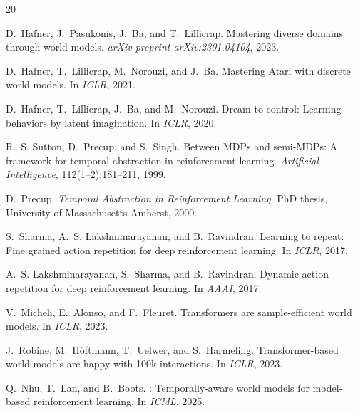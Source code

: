 \documentclass[10pt,letterpaper]{article}
\begin{document}
\begin{thebibliography}{20}

D.~Hafner, J.~Pasukonis, J.~Ba, and T.~Lillicrap.
\newblock Mastering diverse domains through world models.
\newblock \emph{arXiv preprint arXiv:2301.04104}, 2023.

D.~Hafner, T.~Lillicrap, M.~Norouzi, and J.~Ba.
\newblock Mastering {A}tari with discrete world models.
\newblock In \emph{ICLR}, 2021.

D.~Hafner, T.~Lillicrap, J.~Ba, and M.~Norouzi.
\newblock Dream to control: Learning behaviors by latent imagination.
\newblock In \emph{ICLR}, 2020.

R.~S. Sutton, D.~Precup, and S.~Singh.
\newblock Between {MDP}s and semi-{MDP}s: A framework for temporal abstraction in reinforcement learning.
\newblock \emph{Artificial Intelligence}, 112(1--2):181--211, 1999.

D.~Precup.
\newblock \emph{Temporal Abstraction in Reinforcement Learning}.
\newblock PhD thesis, University of Massachusetts Amherst, 2000.

S.~Sharma, A.~S. Lakshminarayanan, and B.~Ravindran.
\newblock Learning to repeat: Fine grained action repetition for deep reinforcement learning.
\newblock In \emph{ICLR}, 2017.

A.~S. Lakshminarayanan, S.~Sharma, and B.~Ravindran.
\newblock Dynamic action repetition for deep reinforcement learning.
\newblock In \emph{AAAI}, 2017.

V.~Micheli, E.~Alonso, and F.~Fleuret.
\newblock Transformers are sample-efficient world models.
\newblock In \emph{ICLR}, 2023.

J.~Robine, M.~H{\"o}ftmann, T.~Uelwer, and S.~Harmeling.
\newblock Transformer-based world models are happy with 100k interactions.
\newblock In \emph{ICLR}, 2023.

Q.~Nhu, T.~Lan, and B.~Boots.
: Temporally-aware world models for model-based reinforcement learning.
\newblock In \emph{ICML}, 2025.


\end{thebibliography}
\end{document}

